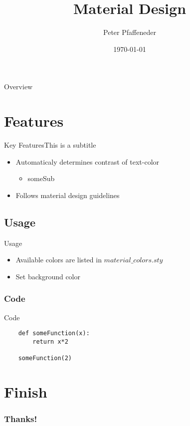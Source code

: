\documentclass{beamer}
\title{Material Design}
\date{\today}
\author{Peter Pfaffeneder}
\institute[Technische Mathematik]
\begin{document}

\begin{frame}
	\titlepage
\end{frame}

{
	\begin{frame}{Overview}
		\tableofcontents
	\end{frame}
}


\section{Features}
\begin{frame}{Key Features}{This is a subtitle}

	\begin{itemize}
		\item Automaticaly determines contrast of text-color
		\begin{itemize}
			\item someSub
		\end{itemize}
		\item Follows material design guidelines
	\end{itemize}
\end{frame}


\subsection{Usage}
\begin{frame}{Usage}
	\begin{itemize}
		\item Available colors are listed in $material\_colors.sty$
		\item Set background color
	\end{itemize}
\end{frame}

\subsubsection{Code}
\begin{frame}[fragile=singleslide]{Code}
	\begin{lstlisting}
	def someFunction(x):
		return x*2

	someFunction(2)
	\end{lstlisting}
\end{frame}

\section{Finish}
\begin{frame}
	\frametitle{Thanks!}
\end{frame}
\end{document}
